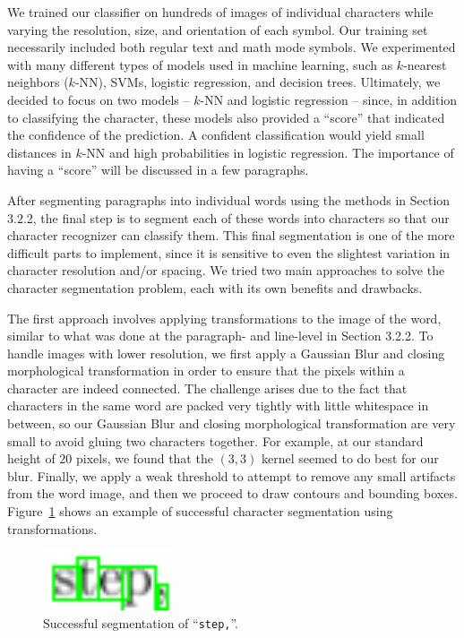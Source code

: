 \documentclass[10pt]{IEEEtran}
\begin{document}
We trained our classifier on hundreds of images of individual characters while varying the resolution, size, and orientation of each symbol. Our training set necessarily included both regular text and math mode symbols. We experimented with many different types of models used in machine learning, such as $k$-nearest neighbors ($k$-NN), SVMs, logistic regression, and decision trees. Ultimately, we decided to focus on two models -- $k$-NN and logistic regression -- since, in addition to classifying the character, these models also provided a ``score'' that indicated the confidence of the prediction. A confident classification would yield small distances in $k$-NN and high probabilities in logistic regression. The importance of having a ``score'' will be discussed in a few paragraphs.

After segmenting paragraphs into individual words using the methods in Section 3.2.2, the final step is to segment each of these words into characters so that our character recognizer can classify them. This final segmentation is one of the more difficult parts to implement, since it is sensitive to even the slightest variation in character resolution and/or spacing. We tried two main approaches to solve the character segmentation problem, each with its own benefits and drawbacks.

The first approach involves applying transformations to the image of the word, similar to what was done at the paragraph- and line-level in Section 3.2.2. To handle images with lower resolution, we first apply a Gaussian Blur and closing morphological transformation in order to ensure that the pixels within a character are indeed connected. The challenge arises due to the fact that characters in the same word are packed very tightly with little whitespace in between, so our Gaussian Blur and closing morphological transformation are very small to avoid gluing two characters together. For example, at our standard height of $20$ pixels, we found that the $(3,3)$ kernel seemed to do best for our blur. Finally, we apply a weak threshold to attempt to remove any small artifacts from the word image, and then we proceed to draw contours and bounding boxes. Figure~\ref{fig:wordBounds1} shows an example of successful character segmentation using transformations.

\begin{figure}[h]
  \centering
    \includegraphics[width=1.5in]{word3-bounds.png}
  \caption{Successful segmentation of ``\texttt{step,}''.}
  \label{fig:wordBounds1}
\end{figure}
\end{document}
